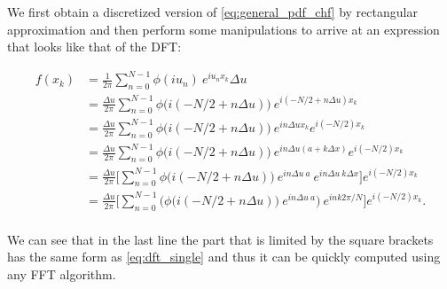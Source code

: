  We first obtain a discretized version of \eqref{eq:general_pdf_chf} by rectangular approximation and then perform some manipulations to arrive at an expression that looks like that of the DFT:
 
 \begin{equation*}
 \begin{split}
 f(x_k) &= \frac{1}{2 \pi} \sum_{n=0}^{N-1} \phi( i u_n) \: e^{i u_n x_k} \Delta u \\
 &= \frac{\Delta u}{2 \pi} \sum_{n=0}^{N-1} \phi\big(i(-N/2 + n \Delta u)\big) \: e^{i (-N/2 + n \Delta u) x_k}  \\
 &= \frac{\Delta u}{2 \pi} \sum_{n=0}^{N-1} \phi\big(i(-N/2 + n \Delta u)\big) \: e^{i n \Delta u x_k} e^{i (-N/2) x_k}\\
 & = \frac{\Delta u}{2 \pi} \sum_{n=0}^{N-1} \phi\big(i(-N/2 + n \Delta u)\big) \: e^{i n \Delta u (a + k \Delta x) } e^{i (-N/2) x_k} \\
 & = \frac{\Delta u}{2 \pi} \bigg[\sum_{n=0}^{N-1} \phi\big(i(-N/2 + n \Delta u)\big) \:e^{i n \Delta u \:a  }\: e^{i n \Delta u \:k \Delta x }\Big] e^{i (-N/2) x_k} \\
 & = \frac{\Delta u}{2 \pi} \bigg[\sum_{n=0}^{N-1} \bigg(\phi\big(i(-N/2 + n \Delta u)\big) \:e^{i n \Delta u\: a  }\bigg)\: e^{i n k 2\pi/N}\Big] e^{i (-N/2) x_k} .\\
 \end{split}
 \end{equation*}
 
 We can see that in the last line the part that is limited by the square brackets has the same form as  \eqref{eq:dft_single} and thus it can be quickly computed using any FFT algorithm.



